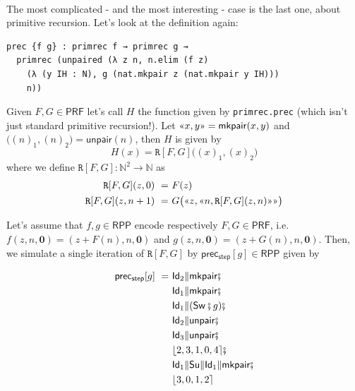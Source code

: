 \documentclass[oneside]{book}
\theoremstyle{definition}
\theoremstyle{remark}
\theoremstyle{plain}
\newcommand{\NN}{\mathbb{N}}
\newcommand{\gl}{\text{\guillemotleft}}
\newcommand{\gr}{\text{\guillemotright}}
\newcommand{\RPP}{\mathsf{RPP}}
\newcommand{\rppId}{\mathsf{Id}}
\newcommand{\rppSu}{\mathsf{Su}}
\newcommand{\rppSw}{\mathsf{Sw}}
\newcommand{\rppCo}{\fatsemi}
\newcommand{\rppPa}{\Vert}
\newcommand{\rpprewire}[1]{\lfloor #1 \rceil}
\newcommand{\rppmkpair}{\mathsf{mkpair}}
\newcommand{\rppunpair}{\mathsf{unpair}}
\newcommand{\rppprecstep}{\mathsf{prec_{step}}}
\newcommand{\PRF}{\mathsf{PRF}}
\newcommand{\prPrec}{\mathtt{R}}
\begin{document}
\paragraph{}

The most complicated - and the most interesting - case is the last one,
about primitive recursion.
Let's look at the definition again:
\begin{lstlisting}
prec {f g} : primrec f → primrec g →
  primrec (unpaired (λ z n, n.elim (f z)
    (λ (y IH : N), g (nat.mkpair z (nat.mkpair y IH)))
    n))
\end{lstlisting}
Given $F, G \in \PRF$ let's call $H$ the function given by \lstinline{primrec.prec}
(which isn't just standard primitive recursion!).
Let $\gl x, y \gr = \rppmkpair(x,y)$ and $\big( (n)_1, (n)_2 \big) = \rppunpair(n)$,
then $H$ is given by
\[ H(x) = \prPrec[F,G]\big( (x)_1, (x)_2 \big) \]
where we define $\prPrec[F,G] : \NN^2 \to \NN$ as
\begin{align*}
  \prPrec[F,G](z,0) \ = \ & F(z) \\
  \prPrec[F,G](z, n+1) \ = \ & G \big( \gl z, \gl n, \prPrec[F,G](z,n) \gr \gr \big)
\end{align*}

Let's assume that $f, g \in \RPP$ encode respectively $F, G \in \PRF$, i.e.
$f(z, n, \boldsymbol{0}) = (z+F(n), n, \boldsymbol{0})$ and $g(z, n, \boldsymbol{0}) = (z+G(n), n, \boldsymbol{0})$.
Then, we simulate a single iteration of $\prPrec[F,G]$ by $\rppprecstep[g] \in \RPP$ given by

\begin{align*}
\rppprecstep[g] \ = \ & \rppId_2 \rppPa \rppmkpair \rppCo                               \\
                      & \rppId_1 \rppPa \rppmkpair \rppCo                               \\
                      & \rppId_1 \rppPa (\rppSw \rppCo g) \rppCo                        \\
                      & \rppId_2 \rppPa \rppunpair \rppCo                               \\
                      & \rppId_3 \rppPa \rppunpair \rppCo                               \\
                      & \rpprewire{2, 3, 1, 0, 4} \rppCo                                \\
                      & \rppId_1 \rppPa \rppSu \rppPa \rppId_1 \rppPa \rppmkpair \rppCo \\
                      & \rpprewire{3, 0, 1, 2}                                          \\
\end{align*}
\end{document}
